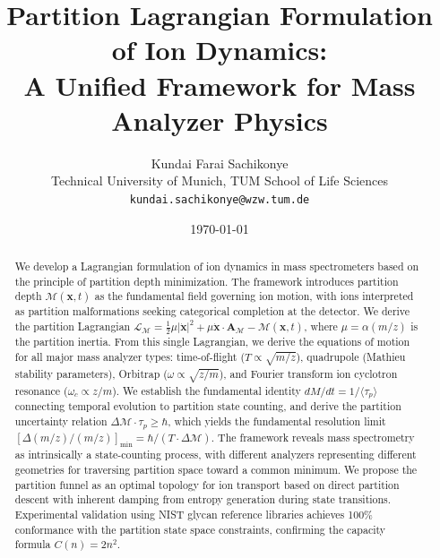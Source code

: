 \documentclass[twocolumn,10pt,a4paper]{article}
\theoremstyle{definition}
\theoremstyle{remark}
\newcommand{\Mdepth}{\mathcal{M}}
\newcommand{\Lagr}{\mathcal{L}}
\newcommand{\Apartition}{\mathbf{A}_{\mathcal{M}}}
\newcommand{\partinert}{\mu}
\newcommand{\taup}{\tau_p}
\begin{document}
\title{\textbf{Partition Lagrangian Formulation of Ion Dynamics:\\A Unified Framework for Mass Analyzer Physics}}

\author{
Kundai Farai Sachikonye\\
Technical University of Munich, TUM School of Life Sciences\\
\texttt{kundai.sachikonye@wzw.tum.de}
}

\date{\today}

\maketitle

\begin{abstract}
We develop a Lagrangian formulation of ion dynamics in mass spectrometers based on the principle of partition depth minimization. The framework introduces partition depth $\Mdepth(\mathbf{x}, t)$ as the fundamental field governing ion motion, with ions interpreted as partition malformations seeking categorical completion at the detector. We derive the partition Lagrangian $\Lagr_{\Mdepth} = \frac{1}{2}\partinert|\dot{\mathbf{x}}|^2 + \partinert\dot{\mathbf{x}}\cdot\Apartition - \Mdepth(\mathbf{x}, t)$, where $\partinert = \alpha(m/z)$ is the partition inertia. From this single Lagrangian, we derive the equations of motion for all major mass analyzer types: time-of-flight ($T \propto \sqrt{m/z}$), quadrupole (Mathieu stability parameters), Orbitrap ($\omega \propto \sqrt{z/m}$), and Fourier transform ion cyclotron resonance ($\omega_c \propto z/m$). We establish the fundamental identity $dM/dt = 1/\langle\taup\rangle$ connecting temporal evolution to partition state counting, and derive the partition uncertainty relation $\Delta\Mdepth \cdot \taup \geq \hbar$, which yields the fundamental resolution limit $[\Delta(m/z)/(m/z)]_{\min} = \hbar/(T\cdot\Delta\Mdepth)$. The framework reveals mass spectrometry as intrinsically a state-counting process, with different analyzers representing different geometries for traversing partition space toward a common minimum. We propose the partition funnel as an optimal topology for ion transport based on direct partition descent with inherent damping from entropy generation during state transitions. Experimental validation using NIST glycan reference libraries achieves 100\% conformance with the partition state space constraints, confirming the capacity formula $C(n) = 2n^2$.
\end{abstract}
\end{document}
